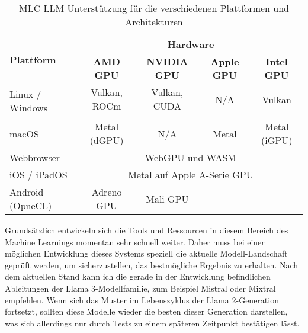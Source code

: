 \documentclass[german,report]{i1thesis}
\begin{document}
\begin{table}[H]
    \centering
    \begin{tabular}{|l|c|c|c|c|}
        \hline
        \multirow{2}[4]{*}{\textbf{Plattform}} & \multicolumn{4}{c|}{\textbf{Hardware}}                                                                                                \\
        \cline{2-5}                            & \textbf{AMD \ac{GPU}}                                  & \textbf{NVIDIA \ac{GPU}} & \textbf{Apple \ac{GPU}} & \textbf{Intel \ac{GPU}} \\
        \hline
        \multirow{2}[2]{*}{Linux / Windows}    & Vulkan, \ac{ROCm}                                      & Vulkan, \ac{CUDA}        & N/A                     & Vulkan                  \\
        \cline{2-5}                            &                                                        &                          &                         &                         \\
        \hline
        macOS                                  & Metal (\acs{dGPU})                                     & N/A                      & Metal                   & Metal (\acs{iGPU})      \\
        \hline
        Webbrowser                             & \multicolumn{4}{c|}{ Web\ac{GPU} und WASM}                                                                                            \\
        \hline
        iOS / iPadOS                           & \multicolumn{4}{c|}{ Metal auf Apple A-Serie \ac{GPU}}                                                                                \\
        \hline
        Android (OpneCL)                       & Adreno \ac{GPU}                                        & Mali \ac{GPU}            &                         &                         \\
        \hline
    \end{tabular}%
    \caption{\ac{MLC LLM} Unterstützung für die verschiedenen Plattformen und Architekturen}
    \label{tab:mlc-llm}
\end{table}

Grundsätzlich entwickeln sich die Tools und Ressourcen in diesem Bereich des Machine Learnings momentan sehr schnell weiter.
Daher muss bei einer möglichen Entwicklung dieses Systems speziell die aktuelle Modell-Landschaft geprüft werden, um sicherzustellen, das bestmögliche Ergebnis zu erhalten.
Nach dem aktuellen Stand kann ich die gerade in der Entwicklung befindlichen Ableitungen der Llama 3-Modellfamilie, zum Beispiel Mistral oder Mixtral empfehlen.
Wenn sich das Muster im Lebenszyklus der Llama 2-Generation fortsetzt, sollten diese Modelle wieder die besten dieser Generation darstellen, was sich allerdings nur durch Tests zu einem späteren Zeitpunkt bestätigen lässt.
\end{document}
